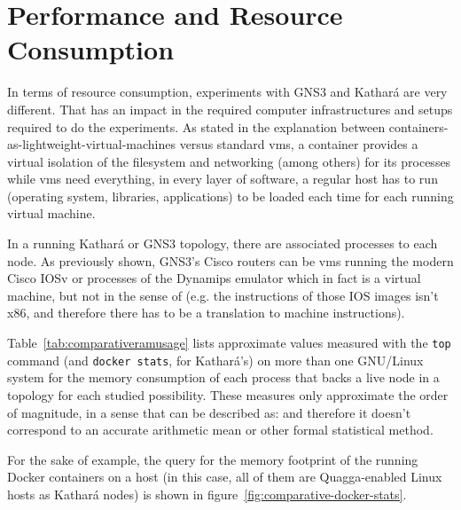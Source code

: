 \section{Performance and Resource Consumption}
\label{sec:comparativeperformance}

In terms of resource consumption, experiments with GNS3 and Kathará are very different.
That has an impact in the required computer infrastructures and setups required to do the experiments.
As stated in the explanation between containers-as-lightweight-virtual-machines versus standard \glspl{vm}, a container provides a virtual isolation of the filesystem and networking (among others) for its processes while \glspl{vm} need everything, in every layer of software, a regular host has to run (operating system, libraries, applications) to be loaded each time for each running virtual machine.

In a running Kathará or GNS3 topology, there are associated processes to each node.
As previously shown, GNS3's Cisco routers can be \glspl{vm} running the modern Cisco IOSv or processes of the Dynamips emulator which in fact is a virtual machine, but not in the sense of  (e.g. the instructions of those IOS images isn't x86, and therefore there has to be a translation to machine instructions).

Table~\ref{tab:comparativeramusage} lists approximate values measured with the \texttt{top} command (and \texttt{docker~stats}, for Kathará's) on more than one GNU/Linux system for the memory consumption of each process that backs a live node in a topology for each studied possibility.
These measures only approximate the order of magnitude, in a sense that can be described as:  and therefore it doesn't correspond to an accurate arithmetic mean or other formal statistical method.



For the sake of example, the query for the memory footprint of the running Docker containers on a host (in this case, all of them are Quagga-enabled Linux hosts as Kathará nodes) is shown in figure~\ref{fig:comparative-docker-stats}.



